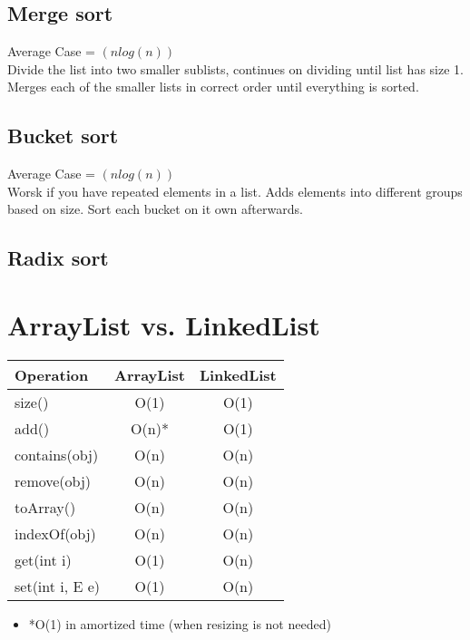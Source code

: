 \documentclass{article}
\begin{document}
\subsection{Merge sort}
Average Case = $(nlog(n))$\\
Divide the list into two smaller sublists, continues on dividing until list has size 1. Merges each of the smaller lists in correct order until everything is sorted. 
\subsection{Bucket sort}
Average Case = $(nlog(n))$\\
Worsk if you have repeated elements in a list. Adds elements into different groups based on size. Sort each bucket on it own afterwards. 

\subsection{Radix sort}

\newpage

\section{ArrayList vs. LinkedList}
\begin{table}[h!]
\centering
\begin{tabular}{|l|c|c|}
\hline
\textbf{Operation} & \textbf{ArrayList} & \textbf{LinkedList} \\
\hline
size() & O(1) & O(1) \\
\hline
add() & O(n)* & O(1) \\
\hline
contains(obj) & O(n) & O(n) \\
\hline
remove(obj) & O(n) & O(n) \\
\hline
toArray() & O(n) & O(n) \\
\hline
indexOf(obj) & O(n) & O(n) \\
\hline
get(int i) & O(1) & O(n) \\
\hline
set(int i, E e) & O(1) & O(n) \\
\hline
\end{tabular}
\end{table}
\begin{itemize}
  \item *O(1) in amortized time (when resizing is not needed)
\end{itemize}
\end{document}
